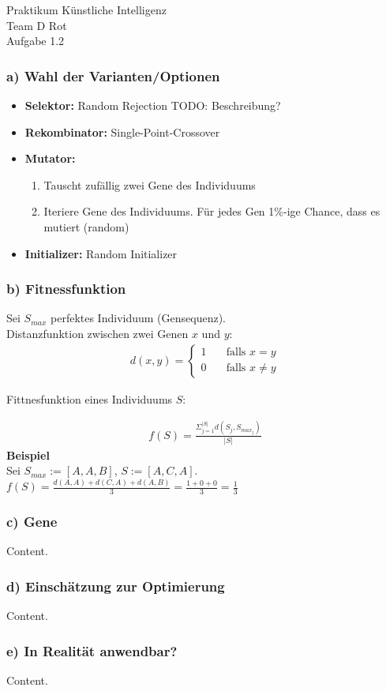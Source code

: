 \documentclass{beamer}
\begin{document}
\begin{frame}
  \begin{center}
    \Huge{Praktikum K\"unstliche Intelligenz} \\
    \vspace{1.5cm}
    \huge{Team D Rot} \\
    \vspace{1.5cm}
    \Large{Aufgabe 1.2}
  \end{center}
\end{frame}

\begin{frame}
  \frametitle{\textbf{a)} Wahl der Varianten/Optionen}
  \begin{itemize}
    \item \textbf{Selektor:} Random Rejection
          TODO: Beschreibung?
    \item \textbf{Rekombinator:} Single-Point-Crossover
    \item \textbf{Mutator:}
      \begin{enumerate}
        \item Tauscht zuf\"allig zwei Gene des Individuums
        \item Iteriere Gene des Individuums. F\"ur jedes
              Gen 1\%-ige Chance, dass es mutiert (random)
      \end{enumerate}
    \item \textbf{Initializer:} Random Initializer
  \end{itemize}
\end{frame}

\begin{frame}
  \frametitle{\textbf{b)} Fitnessfunktion}

  Sei $S_{max}$ perfektes Individuum (Gensequenz). \\

  Distanzfunktion zwischen zwei Genen $x$ und $y$:
  \begin{align*}
    d(x,y) =
      \begin{cases}
        1 & \quad \text{falls } x = y \\
        0 & \quad \text{falls } x \neq y
      \end{cases}
  \end{align*}

  Fittnesfunktion eines Individuums $S$:

  \begin{align*}
    f(S) = \frac{\Sigma_{j=1}^{|S|} d(S_{j},S_{max_j})}
                {|S|}
  \end{align*}
  \textbf{Beispiel} \\
    \vspace{0.5cm}
    Sei $S_{max} := [ A, A, B ]$, $S := [A, C, A]$. \\
    \vspace{0.5cm}
    $f(S) = \frac{d(A,A) + d(C, A) + d(A, B)}{3}
           = \frac{1 + 0 + 0}{3} = \frac{1}{3}$
\end{frame}

\begin{frame}
  \frametitle{\textbf{c)} Gene}
  Content.
\end{frame}

\begin{frame}
  \frametitle{\textbf{d)} Einsch\"atzung zur Optimierung}
  Content.
\end{frame}

\begin{frame}
  \frametitle{\textbf{e)} In Realit\"at anwendbar?}
  Content.
\end{frame}
\end{document}
